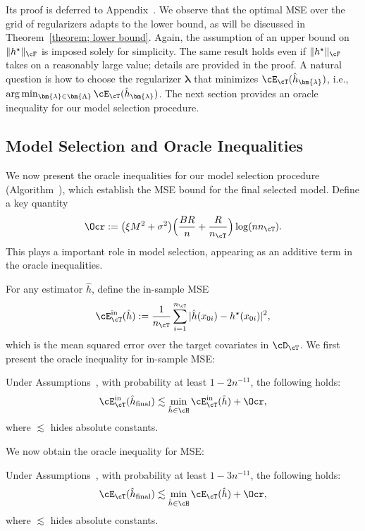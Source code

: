 \documentclass[12pt,a4paper,pdftex,onepage]{article}
\newcommand{\inn}{\operatorname{in}}
\begin{document}
Its proof is deferred to Appendix~. 
We observe that the optimal MSE over the grid of regularizers adapts to the lower bound, as will be discussed in Theorem~\ref{theorem; lower bound}.
Again, the assumption of an upper bound on $\|h^\star\|_{\cF}$ is imposed solely for simplicity. The same result holds even if $\|h^\star\|_{\cF}$ takes on a reasonably large value; details are provided in the proof. A natural question is how to choose the regularizer $\bm{\lambda}$ that minimizes $\cE_\cT(\hat{h}_{\bm{\lambda}})$, i.e.,
\(
\arg \min_{\bm{\lambda}\in\bm{\Lambda}} \cE_\cT(\hat{h}_{\bm{\lambda}})\).
The next section provides an oracle inequality for our model selection procedure.

\subsection{Model Selection and Oracle Inequalities}\label{subsection; model selection}
We now present the oracle inequalities for our model selection procedure (Algorithm~), which establish the MSE bound for the final selected model. 
Define a key quantity
\[
\Ocr := \bigl(\xi M^2 + \sigma^2\bigr)\Bigl(\frac{BR}{n} + \frac{R}{n_{\cT}}\Bigr)\log(n n_\cT).
\]
This plays a important role in model selection, appearing as an additive term in the oracle inequalities.

For any estimator \(\hat{h}\), define the in-sample MSE
\[
\cE_\cT^{\inn}(\hat{h}) := \frac{1}{n_\cT} \sum_{i=1}^{n_\cT} |\hat{h}(x_{0i}) - h^\star(x_{0i})|^2,
\]
which is the mean squared error over the target covariates in \(\cD_\cT\). 
We first present the oracle inequality for in-sample MSE:

\begin{proposition}\label{proposition; in-sample MSE oracle}
Under Assumptions~, with probability at least \(1 - 2n^{-11}\), the following holds:
\[
\cE_{\cT}^{\inn}(\hat{h}_{\operatorname{final}}) 
\lesssim 
\min_{\hat{h} \in \cH} \cE_{\cT}^{\inn}(\hat{h}) 
+ 
\Ocr,
\]
where \(\lesssim\) hides absolute constants.
\end{proposition}

We now obtain the oracle inequality for MSE:
\begin{proposition}\label{proposition; oracle inequality MSE}
Under Assumptions~, with probability at least \(1 - 3n^{-11}\), the following holds:
\[
\cE_{\cT}(\hat{h}_{\operatorname{final}}) 
\lesssim 
\min_{\hat{h} \in \cH} \cE_{\cT}(\hat{h}) 
+ 
\Ocr,
\]
where \(\lesssim\) hides absolute constants.
\end{proposition}
\end{document}
